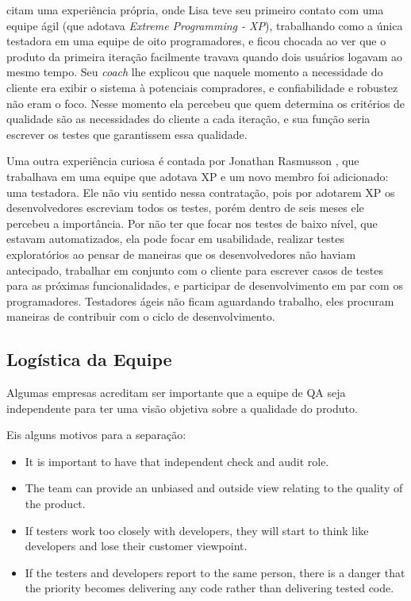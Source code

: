 \documentclass[
	12pt,				%
	openright,			%
	oneside,			%
	a4paper,			%
	english,			%
	brazil,				%
	]{abntex2}
\begin{document}
 citam uma experiência própria, onde Lisa teve seu primeiro contato com uma equipe ágil (que adotava \emph{Extreme Programming - XP}), trabalhando como a única testadora em uma equipe de oito programadores, e ficou chocada ao ver que o produto da primeira iteração facilmente travava quando dois usuários logavam ao mesmo tempo. Seu \emph{coach} lhe explicou que naquele momento a necessidade do cliente era exibir o sistema à potenciais compradores, e confiabilidade e robustez não eram o foco. Nesse momento ela percebeu que quem determina os critérios de qualidade são as necessidades do cliente a cada iteração, e sua função seria escrever os testes que garantissem essa qualidade.

Uma outra experiência curiosa é contada por Jonathan Rasmusson \cite{crispin2009}, que trabalhava em uma equipe que adotava XP e um novo membro foi adicionado: uma testadora. Ele não viu sentido nessa contratação, pois por adotarem XP os desenvolvedores escreviam todos os testes, porém dentro de seis meses ele percebeu a importância. Por não ter que focar nos testes de baixo nível, que estavam automatizados, ela pode focar em usabilidade, realizar testes exploratórios ao pensar de maneiras que os desenvolvedores não haviam antecipado, trabalhar em conjunto com o cliente para escrever casos de testes para as próximas funcionalidades, e participar de desenvolvimento em par com os programadores. Testadores ágeis não ficam aguardando trabalho, eles procuram maneiras de contribuir com o ciclo de desenvolvimento.

\subsection{Logística da Equipe}
Algumas empresas acreditam ser importante que a equipe de QA seja independente para ter uma visão objetiva sobre a qualidade do produto. 

Eis alguns motivos para a separação:

\begin{itemize}
    \item It is important to have that independent check and audit role.
    \item The team can provide an unbiased and outside view relating to the quality of the product.
    \item If testers work too closely with developers, they will start to think like developers and lose their customer viewpoint.
    \item If the testers and developers report to the same person, there is a danger that the priority becomes delivering any code rather than delivering tested code.
\end{itemize}
\end{document}
